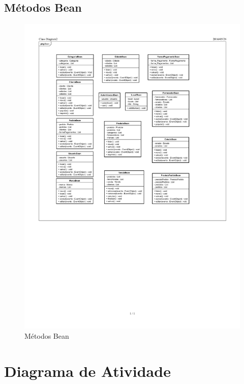 \documentclass[chapter=TITLE,12pt,oneside,a4paper,english,french,sumario=tradicional,spanish,brazil,]{abntex2}
\begin{document}
\subsection{Métodos Bean}
\begin{figure}[h]\centering
\includegraphics[scale=1.2]{metodo-bean.pdf}\caption{Métodos Bean}
\end{figure}

\newpage
\section{Diagrama de Atividade}
\end{document}

